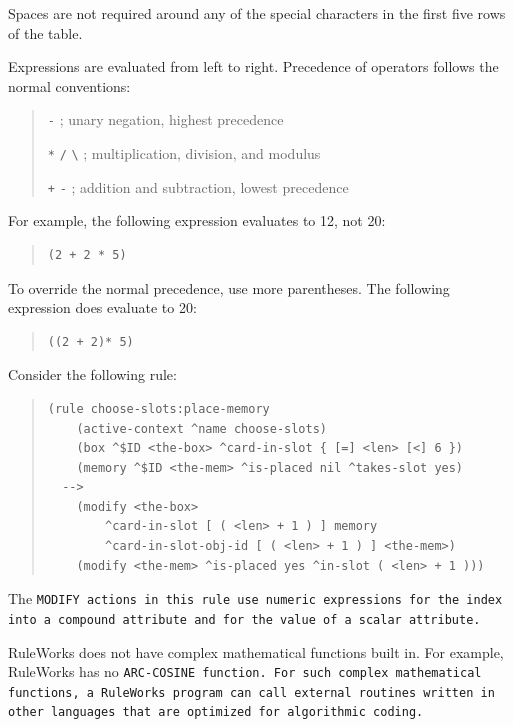 Spaces are not required around any of the special characters in the
first five rows of the table.

Expressions are evaluated from left to right. Precedence of operators
follows the normal conventions:

\begin{quote}
\verb|-|  ; unary negation, highest precedence

\verb|*| \verb|/| \verb|\| ; multiplication, division, and modulus

\verb|+| \verb|-|  ; addition and subtraction, lowest precedence
\end{quote}

For example, the following expression evaluates to 12, not 20:

\begin{quote}
\begin{verbatim}
(2 + 2 * 5)
\end{verbatim}
\end{quote}

To override the normal precedence, use more parentheses. The following
expression does evaluate to 20:

\begin{quote}
\begin{verbatim}
((2 + 2)* 5)
\end{verbatim}
\end{quote}

Consider the following rule:
\begin{quote}
\begin{verbatim}
(rule choose-slots:place-memory
    (active-context ^name choose-slots)
    (box ^$ID <the-box> ^card-in-slot { [=] <len> [<] 6 })
    (memory ^$ID <the-mem> ^is-placed nil ^takes-slot yes)
  -->
    (modify <the-box>
        ^card-in-slot [ ( <len> + 1 ) ] memory
        ^card-in-slot-obj-id [ ( <len> + 1 ) ] <the-mem>)
    (modify <the-mem> ^is-placed yes ^in-slot ( <len> + 1 )))
\end{verbatim}
\end{quote}
    
The \tt{MODIFY} actions in this rule use numeric expressions for
the index into a compound attribute and for the value of a
scalar attribute.

\begin{note}
  RuleWorks does not have complex mathematical functions built in. For
  example, RuleWorks has no \tt{ARC-COSINE} function.  For such
  complex mathematical functions, a RuleWorks program can call
  external routines written in other languages that are optimized for
  algorithmic coding.
\end{note}

